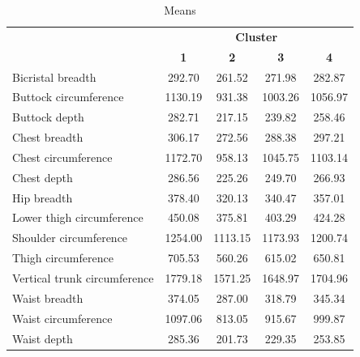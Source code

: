 \documentclass[12pt,a4paper,openany,UKenglish]{scrreprt}
\begin{document}
\begin{table}[H]
	\footnotesize
	\centering
	\caption{Means}
	\begin{tabular}{lcccc}
		\cline{2-5}
		                             & \multicolumn{4}{c}{\textbf{Cluster}}                                                \\
		                             & \textbf{1}                           & \textbf{2}    & \textbf{3}    & \textbf{4}   \\
		\hline\hline
		Bicristal breadth            & 292.70                               & 261.52        & 271.98        & 282.87       \\
		Buttock circumference        & 1130.19                              & 931.38        & 1003.26       & 1056.97      \\
		Buttock depth                & 282.71                               & 217.15        & 239.82        & 258.46       \\
		Chest breadth                & 306.17                               & 272.56        & 288.38        & 297.21       \\
		Chest circumference          & 1172.70                              & 958.13        & 1045.75       & 1103.14      \\
		Chest depth                  & 286.56                               & 225.26        & 249.70        & 266.93       \\
		Hip breadth                  & 378.40                               & 320.13        & 340.47        & 357.01       \\
		Lower thigh circumference    & 450.08                               & 375.81        & 403.29        & 424.28       \\
		Shoulder circumference       & 1254.00                              & 1113.15       & 1173.93       & 1200.74      \\
		Thigh circumference          & 705.53                               & 560.26        & 615.02        & 650.81       \\
		Vertical trunk circumference & 1779.18                              & 1571.25       & 1648.97       & 1704.96      \\
		Waist breadth                & 374.05                               & 287.00        & 318.79        & 345.34       \\
		Waist circumference          & 1097.06                              & 813.05        & 915.67        & 999.87       \\
		Waist depth                  & 285.36                               & 201.73        & 229.35        & 253.85       \\

\end{tabular}
\end{table}
\end{document}
